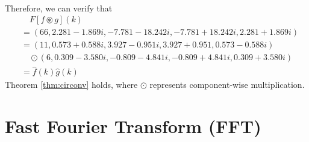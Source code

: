 \begin{solution}
\begin{align*}
\end{align*}
Therefore, we can verify that
\begin{align*}
&\quad F[f \circledast g](k) \\
&= (66, 2.281 - 1.869i, -7.781 - 18.242i, -7.781 + 18.242i, 2.281 + 1.869i) \\
&= (11, 0.573+0.588i, 3.927-0.951i, 3.927+0.951, 0.573-0.588i) \\
&\quad \odot (6, 0.309-3.580i, -0.809-4.841i, -0.809+4.841i, 0.309+3.580i) \\
&= \hat{f}(k)\hat{g}(k)
\end{align*}
Theorem \ref{thm:circonv} holds, where $\odot$ represents component-wise multiplication.
\end{solution}

\section{Fast Fourier Transform (FFT)}

